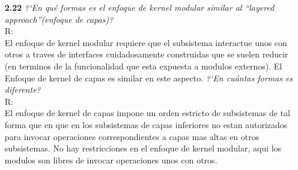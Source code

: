 \begin{itemize}
\emph{?`C\'omo interactuan los programas de usuarios y servicios de sistema en la arquitectura microkernel?}\\
R:\\
Se comunican mediante \emph{paso de mensajes}, el programa de usuario y el servicio nunca interactuan directamente, se comunican de manera indirecta intercambiando mensajes con el microkernel.

\emph{?`Cu\'ales son las desventajas de usar el enfoque microkernel?}\\
R:\\
Sus principales dificultades son:
\begin{itemize}
	\item la complejidad en la sincronizaci\'on de todos los m\'odulos que componen el microkernel y su acceso a la memoria
	\item mas sw de interfaz es necesario, existe la posibilidad de una perdida de rendimiento
	\item Mensajes de bugs pueden ser mas dificil de arreglar debido al largo viaje que tienen que tomar en comparacion a un kernel mononucleo.
    	\item Proceso de gestion en general puede ser muy complicado.
\end{itemize}
\item[\textbf{2.22}]\emph{?`En qu\'e formas es el enfoque de kernel modular similar al ``layered approach''(enfoque de capas)?}\\
R:\\
El enfoque de kernel modular requiere que el subsistema interactue
unos con otros a traves de interfaces cuidadosamente construidas que
se suelen reducir (en terminos de la funcionalidad que esta expuesta
a modulos externos). El Enfoque de kernel de capas es similar en este
aspecto.
\emph{?`En cu\'antas formas es diferente?}\\
R:\\
El enfoque de kernel de capas impone un orden estricto de subsistemas
de tal forma que en que en los subsistemas de capas inferiores no estan
autorizados para invocar operaciones correspondientes a capas mas altas
en otros subsistemas.
No hay restricciones en el enfoque de kernel modular, aqui los modulos
son libres de invocar operaciones unos con otros.
\end{itemize}
